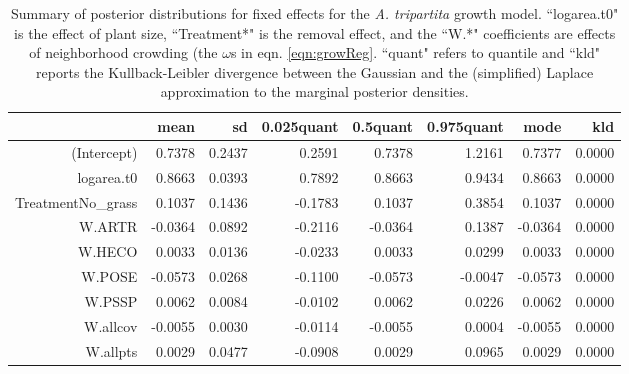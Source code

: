 \documentclass[11pt]{article}
\begin{document}
\begin{table}[ht]
\centering
\caption{Summary of posterior distributions for fixed effects for the \textit{A. tripartita} growth model. ``logarea.t0" is the effect of plant size, ``Treatment*" is the removal effect, and the ``W.*" coefficients are effects of neighborhood crowding (the $\omega$s in eqn. \ref{eqn:growReg}. ``quant" refers to quantile and ``kld" reports the Kullback-Leibler divergence between the Gaussian and the (simplified) Laplace approximation to the marginal posterior densities.} 
\label{ARTRgrowth}
\begin{tabular}{rrrrrrrr}
  \hline
 & mean & sd & 0.025quant & 0.5quant & 0.975quant & mode & kld \\ 
  \hline
(Intercept) & 0.7378 & 0.2437 & 0.2591 & 0.7378 & 1.2161 & 0.7377 & 0.0000 \\ 
  logarea.t0 & 0.8663 & 0.0393 & 0.7892 & 0.8663 & 0.9434 & 0.8663 & 0.0000 \\ 
  TreatmentNo\_grass & 0.1037 & 0.1436 & -0.1783 & 0.1037 & 0.3854 & 0.1037 & 0.0000 \\ 
  W.ARTR & -0.0364 & 0.0892 & -0.2116 & -0.0364 & 0.1387 & -0.0364 & 0.0000 \\ 
  W.HECO & 0.0033 & 0.0136 & -0.0233 & 0.0033 & 0.0299 & 0.0033 & 0.0000 \\ 
  W.POSE & -0.0573 & 0.0268 & -0.1100 & -0.0573 & -0.0047 & -0.0573 & 0.0000 \\ 
  W.PSSP & 0.0062 & 0.0084 & -0.0102 & 0.0062 & 0.0226 & 0.0062 & 0.0000 \\ 
  W.allcov & -0.0055 & 0.0030 & -0.0114 & -0.0055 & 0.0004 & -0.0055 & 0.0000 \\ 
  W.allpts & 0.0029 & 0.0477 & -0.0908 & 0.0029 & 0.0965 & 0.0029 & 0.0000 \\ 
   \hline
\end{tabular}
\end{table}
\end{document}
